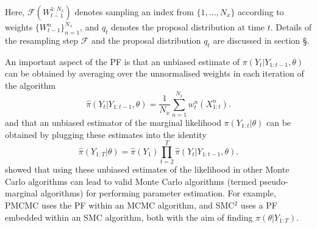 \documentclass[a4paper,12pt]{article}
\begin{document}
\noindent Here, $\mathcal{F}(W_{t-1}^{1:N_x})$ denotes sampling an index from  $\{ 1,...,N_x\}$ according to weights $\{W_{t-1}^n\}_{n=1}^{N_x}$, and  $q_t$ denotes the proposal distribution at time $t$. Details of the resampling step $\mathcal{F}$ and the proposal distribution  $q_t$ are discussed in section \S.



An important aspect of the PF is that an unbiased estimate of $\pi (Y_t \vert Y_{1:t-1}, \theta)$ can be  obtained by averaging over the unnormalised weights in each iteration of the algorithm
\begin{equation}\label{eqn:Ident4}
\hat{\pi} (Y_t \vert Y_{1:t-1}, \theta) = \frac{1}{N_x} \sum_{n=1}^{N_x} w_t^n (X_{1:t}^n).
\end{equation}
and that an unbiased estimator of the marginal likelihood $\pi (Y_{1:t} \vert  \theta)$ can be obtained by plugging these estimates into the identity \cite{DelMoral2004}
\begin{equation}\label{eqn:Ident3}
\hat{\pi} (Y_{1:T} \vert \theta) = \hat{\pi}(Y_1) \prod_{t=2}^T \hat{\pi} (Y_t \vert Y_{1:t-1}, \theta).
\end{equation}
\cite{Andrieu2009} showed that using these unbiased estimates of the likelihood in other Monte Carlo algorithms can lead to valid Monte Carlo algorithms (termed pseudo-marginal algorithms) for performing parameter estimation. For example, PMCMC \cite{Andrieu2010} uses the PF within an MCMC algorithm, and SMC$^2$ \cite{Chopin2012} uses a PF embedded within an SMC algorithm, both with the aim of finding $\pi(\theta | Y_{1:T})$.
\end{document}
